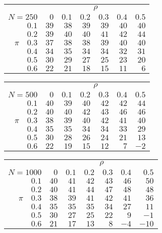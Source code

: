 \begin{tabular}{r|rrrrrr}
\hline\hline
 &\multicolumn{6}{c}{$\rho$} \\ 
 $N = 250$ & $0$ & $0.1$ & $0.2$ & $0.3$ & $0.4$ & $0.5$ \\ 
 \hline$0.1$ & $39$ & $38$ & $39$ & $39$ & $40$ & $40$\\ 
$0.2$ & $39$ & $40$ & $40$ & $41$ & $42$ & $44$\\ 
$\pi\quad$$0.3$ & $37$ & $38$ & $38$ & $39$ & $40$ & $40$\\ 
$0.4$ & $34$ & $35$ & $34$ & $34$ & $32$ & $31$\\ 
$0.5$ & $30$ & $29$ & $27$ & $25$ & $23$ & $20$\\ 
$0.6$ & $22$ & $21$ & $18$ & $15$ & $11$ & $6$\\ 
 \hline 
 \end{tabular}
 
 \vspace{2em} 
 
\begin{tabular}{r|rrrrrr}
\hline\hline
 &\multicolumn{6}{c}{$\rho$} \\ 
 $N = 500$ & $0$ & $0.1$ & $0.2$ & $0.3$ & $0.4$ & $0.5$ \\ 
 \hline$0.1$ & $40$ & $39$ & $40$ & $42$ & $42$ & $44$\\ 
$0.2$ & $40$ & $40$ & $42$ & $43$ & $46$ & $46$\\ 
$\pi\quad$$0.3$ & $38$ & $39$ & $40$ & $42$ & $41$ & $40$\\ 
$0.4$ & $35$ & $35$ & $34$ & $34$ & $33$ & $29$\\ 
$0.5$ & $30$ & $28$ & $26$ & $24$ & $21$ & $13$\\ 
$0.6$ & $22$ & $19$ & $15$ & $12$ & $7$ & $-2$\\ 
 \hline 
 \end{tabular}
 
 \vspace{2em} 
 
\begin{tabular}{r|rrrrrr}
\hline\hline
 &\multicolumn{6}{c}{$\rho$} \\ 
 $N = 1000$ & $0$ & $0.1$ & $0.2$ & $0.3$ & $0.4$ & $0.5$ \\ 
 \hline$0.1$ & $40$ & $41$ & $42$ & $43$ & $46$ & $50$\\ 
$0.2$ & $40$ & $41$ & $44$ & $47$ & $48$ & $48$\\ 
$\pi\quad$$0.3$ & $38$ & $39$ & $41$ & $42$ & $41$ & $36$\\ 
$0.4$ & $35$ & $35$ & $35$ & $34$ & $27$ & $11$\\ 
$0.5$ & $30$ & $27$ & $25$ & $22$ & $9$ & $-1$\\ 
$0.6$ & $21$ & $17$ & $13$ & $8$ & $-4$ & $-10$\\ 
 \hline 
 \end{tabular}